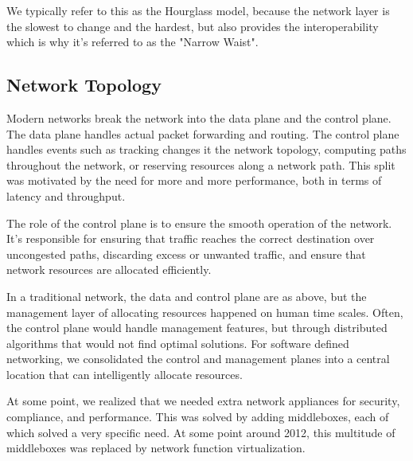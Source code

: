 \documentclass{idc_msc}
\begin{document}
We typically refer to this as the Hourglass model, because the network layer is the slowest to change and the hardest, but also provides the interoperability which is why it's referred to as the "Narrow Waist".

\subsection{Network Topology}

Modern networks break the network into the data plane and the control plane.
The data plane handles actual packet forwarding and routing.
The control plane handles events such as tracking changes it the network topology, computing paths throughout the network, or reserving resources along a network path.
This split was motivated by the need for more and more performance, both in terms of latency and throughput.

The role of the control plane is to ensure the smooth operation of the network.
It's responsible for ensuring that traffic reaches the correct destination over uncongested paths, discarding excess or unwanted traffic, and ensure that network resources are allocated efficiently.

In a traditional network, the data and control plane are as above, but the management layer of allocating resources happened on human time scales. Often, the control plane would handle management features, but through distributed algorithms that would not find optimal solutions.
For software defined networking, we consolidated the control and management planes into a central location that can intelligently allocate resources.

At some point, we realized that we needed extra network appliances for security, compliance, and performance.
This was solved by adding middleboxes, each of which solved a very specific need.
At some point around 2012, this multitude of middleboxes was replaced by network function virtualization.
\end{document}
